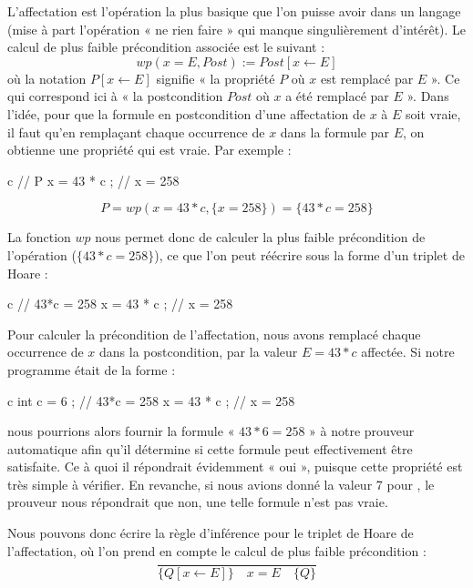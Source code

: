 

L'affectation est l'opération la plus basique que l'on puisse avoir dans un
langage (mise à part l'opération « ne rien faire » qui manque singulièrement
d'intérêt). Le calcul de plus faible précondition associée est le suivant :
$$wp(x = E , Post) := Post[x \leftarrow E]$$
où la notation $P[x \leftarrow E]$ signifie « la propriété $P$ où $x$ est remplacé
par $E$ ». Ce qui correspond ici à « la postcondition $Post$ où $x$ a été
remplacé par $E$ ». Dans l'idée, pour que la formule en postcondition d'une
affectation de $x$ à $E$ soit vraie, il faut qu'en remplaçant chaque occurrence de
$x$ dans la formule par $E$, on obtienne une propriété qui est vraie. Par exemple :



\begin{CodeBlock}{c}
// { P }
x = 43 * c ;
// { x = 258 }
\end{CodeBlock}

$$P = wp(x = 43*c , \{x = 258\}) = \{43*c = 258\}$$


La fonction $wp$ nous permet donc de calculer la plus faible précondition de
l'opération ($\{43*c = 258\}$), ce que l'on peut réécrire sous la forme d'un
triplet de Hoare :



\begin{CodeBlock}{c}
// { 43*c = 258 }
x = 43 * c ;
// { x = 258 }
\end{CodeBlock}



Pour calculer la précondition de l'affectation, nous avons remplacé chaque
occurrence de $x$ dans la postcondition, par la valeur $E = 43*c$ affectée.
Si notre programme était de la forme :
\begin{CodeBlock}{c}
int c = 6 ;
// { 43*c = 258 }
x = 43 * c ;
// { x = 258 }
\end{CodeBlock}
nous pourrions alors fournir la formule « $43*6 = 258$ » à notre prouveur automatique
afin qu'il détermine si cette formule peut effectivement être satisfaite. Ce à quoi
il répondrait évidemment « oui », puisque cette propriété est très simple à vérifier.
En revanche, si nous avions donné la valeur 7 pour , le prouveur nous répondrait
que non, une telle formule n'est pas vraie.



Nous pouvons donc écrire la règle d'inférence pour le triplet de Hoare de
l'affectation, où l'on prend en compte le calcul de plus faible précondition :
$$\dfrac{}{\{Q[x \leftarrow E] \}\quad x = E \quad\{ Q \}}$$


